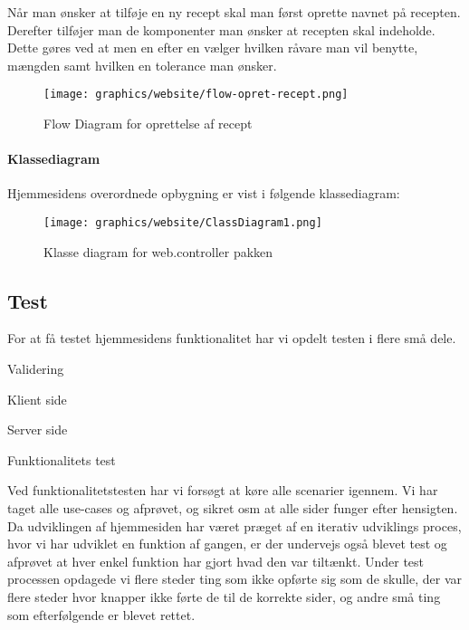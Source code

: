 \documentclass[a4paper]{article}
\newenvironment{my_itemize}
{\begin{itemize}
  \setlength{\itemsep}{1pt}
  \setlength{\parskip}{0pt}
  \setlength{\parsep}{0pt}}
{\end{itemize}}
\newenvironment{changemargin}[2]{%
\begin{list}{}{%
\setlength{\topsep}{0pt}%
\setlength{\leftmargin}{#1}%
\setlength{\rightmargin}{#2}%
\setlength{\listparindent}{\parindent}%
\setlength{\itemindent}{\parindent}%
\setlength{\parsep}{\parskip}%
}%
\item[]}{\end{list}}
\begin{document}
Når man ønsker at tilføje en ny recept skal man først oprette navnet på recepten. Derefter tilføjer man de komponenter man ønsker at recepten skal indeholde. Dette gøres ved at men en efter en vælger hvilken råvare man vil benytte, mængden samt hvilken en tolerance man ønsker. 

\begin{figure}[H]
  \centering
  \texttt{[image: graphics/website/flow-opret-recept.png]}
  \caption{Flow Diagram for oprettelse af recept}
\end{figure}

\paragraph{Klassediagram} %

Hjemmesidens overordnede opbygning er vist i følgende klassediagram:

\begin{figure}[H]
\begin{changemargin}{-1cm}{-1cm}
  \centering
  \texttt{[image: graphics/website/ClassDiagram1.png]}
  \caption{Klasse diagram for web.controller pakken}
\end{changemargin}
\end{figure}






\subsection{Test} %

For at få testet hjemmesidens funktionalitet har vi opdelt testen i flere små dele.

\begin{my_itemize}
  \item Validering
    \begin{my_itemize}
      \item Klient side
      \item Server side
    \end{my_itemize}
\item Funktionalitets test
\end{my_itemize}

Ved funktionalitetstesten har vi forsøgt at køre alle scenarier igennem. Vi har taget alle use-cases og afprøvet, og sikret osm at alle sider funger efter hensigten. Da udviklingen af hjemmesiden har været præget af en iterativ udviklings proces, hvor vi har udviklet en funktion af gangen, er der undervejs også blevet test og afprøvet at hver enkel funktion har gjort hvad den var tiltænkt. Under test processen opdagede vi flere steder ting som ikke opførte sig som de skulle, der var flere steder hvor knapper ikke førte de til de korrekte sider, og andre små ting som efterfølgende er blevet rettet. 
\end{document}
